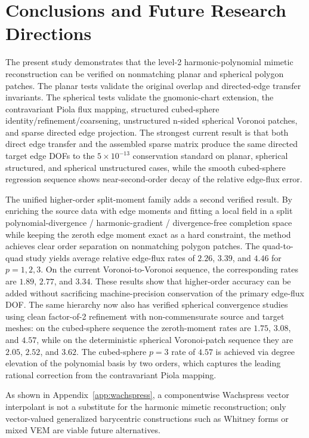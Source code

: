 \documentclass[11pt]{article}
\begin{document}
\section{Conclusions and Future Research Directions}

The present study demonstrates that the level-2 harmonic-polynomial mimetic
reconstruction can be verified on nonmatching planar and spherical polygon
patches.  The planar tests validate
the original overlap and directed-edge transfer invariants.  The spherical tests
validate the gnomonic-chart extension, the contravariant Piola flux mapping,
structured cubed-sphere identity/refinement/coarsening, unstructured n-sided
spherical Voronoi patches, and sparse directed edge projection.  The strongest
current result is that both direct edge transfer and the assembled sparse matrix
produce the same directed target edge DOFs to the \(5\times10^{-13}\)
conservation standard on planar, spherical structured, and spherical
unstructured cases, while the smooth cubed-sphere regression sequence shows
near-second-order decay of the relative edge-flux error.

The unified higher-order split-moment family adds a second verified result.  By
enriching the source data with edge moments and fitting a local field in a
split polynomial-divergence / harmonic-gradient / divergence-free completion
space while keeping the zeroth edge moment exact as a hard constraint, the
method achieves clear order separation on nonmatching polygon patches.  The
quad-to-quad study yields average relative edge-flux rates of \(2.26\),
\(3.39\), and \(4.46\) for \(p=1,2,3\).  On the current Voronoi-to-Voronoi
sequence, the corresponding rates are \(1.89\), \(2.77\), and \(3.34\).  These
results show that higher-order accuracy can be added without sacrificing
machine-precision conservation of the primary edge-flux DOF.  The same
hierarchy now also has verified spherical convergence studies using clean
factor-of-2 refinement with non-commensurate source and target meshes: on the
cubed-sphere sequence the zeroth-moment rates are \(1.75\), \(3.08\), and
\(4.57\), while on the deterministic spherical Voronoi-patch sequence they are
\(2.05\), \(2.52\), and \(3.62\).  The cubed-sphere \(p=3\) rate of \(4.57\) is
achieved via degree elevation of the polynomial basis by two orders, which
captures the leading rational correction from the contravariant Piola mapping.

As shown in Appendix~\ref{app:wachspress}, a componentwise Wachspress vector
interpolant is not a substitute for the harmonic mimetic reconstruction; only
vector-valued generalized barycentric constructions such as Whitney forms or
mixed VEM are viable future alternatives.
\end{document}

